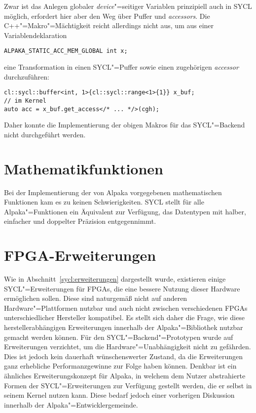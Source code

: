 Zwar ist das Anlegen globaler \textit{device}"=seitiger Variablen prinzipiell
auch in SYCL möglich, erfordert hier aber den Weg über Puffer und
\textit{accessors}. Die C++"=Makro"=Mächtigkeit reicht allerdings nicht aus, um
aus einer Variablendeklaration

\begin{code}
    \begin{verbatim}
ALPAKA_STATIC_ACC_MEM_GLOBAL int x;
    \end{verbatim}
\end{code}

eine Transformation in einen SYCL"=Puffer sowie einen zugehörigen
\textit{accessor} durchzuführen:

\begin{code}
    \begin{verbatim}
cl::sycl::buffer<int, 1>{cl::sycl::range<1>{1}} x_buf;
// im Kernel
auto acc = x_buf.get_access</* ... */>(cgh);
    \end{verbatim}
\end{code}

Daher konnte die Implementierung der obigen Makros für das SYCL"=Backend nicht
durchgeführt werden.

\section{Mathematikfunktionen}

Bei der Implementierung der von Alpaka vorgegebenen mathematischen Funktionen
kam es zu keinen Schwierigkeiten. SYCL stellt für alle Alpaka"=Funktionen ein
Äquivalent zur Verfügung, das Datentypen mit halber, einfacher und doppelter
Präzision entgegennimmt.

\section{FPGA-Erweiterungen}\label{implementierung:probleme:fpga}

Wie in Abschnitt~\ref{sycl:erweiterungen} dargestellt wurde, existieren einige
SYCL"=Erweiterungen für FPGAs, die eine bessere Nutzung dieser Hardware
ermöglichen sollen. Diese sind naturgemäß nicht auf anderen
Hardware"=Plattformen nutzbar und auch nicht zwischen verschiedenen
FPGAs unterschiedlicher Hersteller kompatibel. Es stellt sich daher die Frage,
wie diese herstellerabhängigen Erweiterungen innerhalb der Alpaka"=Bibliothek
nutzbar gemacht werden können. Für den SYCL"=Backend"=Prototypen wurde auf
Erweiterungen verzichtet, um die Hardware"=Unabhängigkeit nicht zu gefährden.
Dies ist jedoch kein dauerhaft wünschenswerter Zustand, da die Erweiterungen
ganz erhebliche Performanzgewinne zur Folge haben können. Denkbar ist ein
ähnliches Erweiterungskonzept für Alpaka, in welchem dem Nutzer abstrahierte
Formen der SYCL"=Erweiterungen zur Verfügung gestellt werden, die er selbst in
seinem Kernel nutzen kann. Diese bedarf jedoch einer vorherigen Diskussion
innerhalb der Alpaka"=Entwicklergemeinde.

